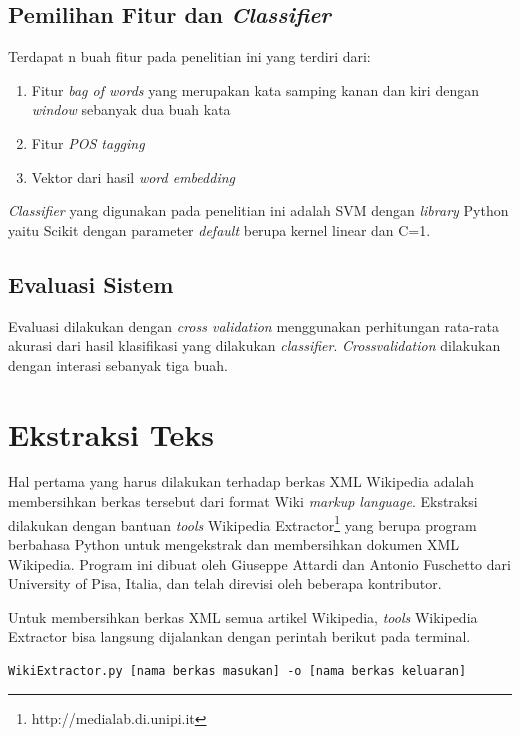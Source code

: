 \subsection{Pemilihan Fitur dan \textit{Classifier}}
Terdapat n buah fitur pada penelitian ini yang terdiri dari:

\begin{enumerate}
	\item Fitur \textit{bag of words} yang merupakan kata samping kanan dan kiri dengan \textit{window} sebanyak dua buah kata
	\item Fitur \textit{POS tagging}
	\item Vektor dari hasil \textit{word embedding}
\end{enumerate}

\textit{Classifier} yang digunakan pada penelitian ini adalah SVM dengan \textit{library} Python yaitu Scikit dengan parameter \textit{default} berupa kernel linear dan C=1.

\subsection{Evaluasi Sistem}
Evaluasi dilakukan dengan \textit{cross validation} menggunakan perhitungan rata-rata akurasi dari hasil klasifikasi yang dilakukan \textit{classifier}. \textit{Crossvalidation} dilakukan dengan interasi sebanyak tiga buah.

\section{Ekstraksi Teks}
Hal pertama yang harus dilakukan terhadap berkas XML Wikipedia adalah membersihkan berkas tersebut dari format Wiki \textit{markup language}. Ekstraksi dilakukan dengan bantuan \textit{tools} Wikipedia Extractor\footnote{http://medialab.di.unipi.it} yang berupa program berbahasa Python untuk mengekstrak dan membersihkan dokumen XML Wikipedia. Program ini dibuat oleh Giuseppe Attardi dan Antonio Fuschetto dari University of Pisa, Italia, dan telah direvisi oleh beberapa kontributor. 

Untuk membersihkan berkas XML semua artikel Wikipedia, \textit{tools} Wikipedia Extractor bisa langsung dijalankan dengan perintah berikut pada terminal.

\begin{lstlisting}
WikiExtractor.py [nama berkas masukan] -o [nama berkas keluaran]
\end{lstlisting}

